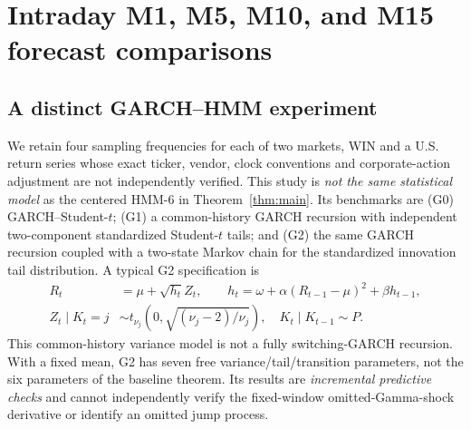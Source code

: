 \documentclass[11pt,a4paper]{article}
\begin{document}
\section{Intraday M1, M5, M10, and M15 forecast comparisons}\label{sec:freq}
\subsection{A distinct GARCH--HMM experiment}
We retain four sampling frequencies for each of two markets, WIN and a U.S. return series whose exact ticker, vendor, clock conventions and corporate-action adjustment are not independently verified. This study is \emph{not the same statistical model} as the centered HMM-6 in Theorem~\ref{thm:main}. Its benchmarks are (G0) GARCH--Student-$t$; (G1) a common-history GARCH recursion with independent two-component standardized Student-$t$ tails; and (G2) the same GARCH recursion coupled with a two-state Markov chain for the standardized innovation tail distribution. A typical G2 specification is
\begin{align}
R_t &= \mu+\sqrt{h_t}Z_t,\qquad h_t=\omega+\alpha(R_{t-1}-\mu)^2+\beta h_{t-1},\\
Z_t\mid K_t=j &\sim t_{\nu_j}\!\left(0,\sqrt{(\nu_j-2)/\nu_j}\right),\quad K_t\mid K_{t-1}\sim P.
\end{align}
This common-history variance model is not a fully switching-GARCH recursion. With a fixed mean, G2 has seven free variance/tail/transition parameters, not the six parameters of the baseline theorem. Its results are \emph{incremental predictive checks} and cannot independently verify the fixed-window omitted-Gamma-shock derivative or identify an omitted jump process.
\end{document}
